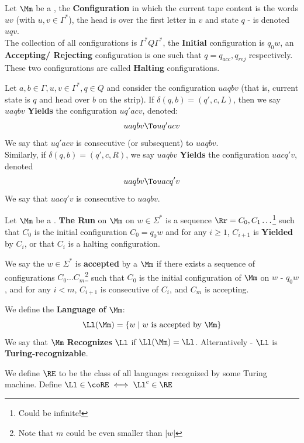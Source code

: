 \begin{yellowBox}
	\begin{defn}
		[Configurations] Let $\Mm$ be a \TM, the \textbf{Configuration} in which the current tape content is the words $uv$ (with $u,v\in \Gamma^*$), the head is over the first letter in $v$ and state $q$ - is denoted $uqv$. \\
		The collection of all configurations is $\Gamma^*Q\Gamma^*$, the \textbf{Initial} configuration is $q_0w$, an \textbf{Accepting/ Rejecting} configuration is one such that $q = q_{acc}, q_{rej}$ respectively. These two configurations are called \textbf{Halting} configurations.
	\end{defn}
	\begin{defn}
		 Let $a,b\in \Gamma, u,v\in \Gamma^*, q\in Q$ and consider the configuration $uaqbv$ (that is, current state is $q$ and head over $b$ on the strip). If $\delta(q,b) = (q', c, L)$, then we say $uaqbv$ \textbf{Yields} the configuration $uq'acv$, denoted:
		\[
		uaqbv \To uq'acv
		\]
		We say that $uq'acv$ is consecutive (or subsequent) to $uaqbv$. \\
		Similarly, if $\delta(q,b) = (q', c, R)$, we say $uaqbv$ \textbf{Yields} the configuration $uacq'v$, denoted
		\[
		uaqbv \To uacq'v
		\]
		We say that $uacq'v$ is consecutive to $uaqbv$. \\
	\end{defn}
	\begin{defn}
		Let $\Mm$ be a \TM. \textbf{The Run} on $\Mm$ on $w\in \Sigma^*$ is a sequence $\Rr = C_0, C_1\ldots $\footnote{Could be infinite!} such that $C_0$ is the initial configuration $C_0 = q_0w$ and for any $i\geq 1$, $C_{i+1}$ is \textbf{Yielded} by $C_i$, or that $C_i$ is a halting configuration.
	\end{defn}
	\begin{defn}
		We say the $w\in \Sigma^*$ is \textbf{accepted} by a \TM $\Mm$ if there exists a sequence of configurations $C_0\ldots C_m$\footnote{Note that $m$ could be even smaller than $|w|$} such that $C_0$ is the initial configuration of $\Mm$ on $w$ - $q_0w$, and for any $i<m$, $C_{i+1}$ is consecutive of $C_i$, and $C_m$ is accepting.
	\end{defn}
	\begin{defn}
		 We define the \textbf{Language of \TM} $\Mm$:\[
		\Ll(\Mm) = \{w\mid w\text{ is accepted by }\Mm\}
		\]
		We say that $\Mm$ \textbf{Recognizes} $\Ll$ if $\Ll(\Mm) = \Ll$. Alternatively - $\Ll$ is \textbf{Turing-recognizable}.
	\end{defn}
	\begin{defn}
		 We define $\RE$ to be the class of all languages recognized by some Turing machine. Define $\Ll\in \coRE \iff \Ll^c\in \RE$
	\end{defn}
\end{yellowBox}
